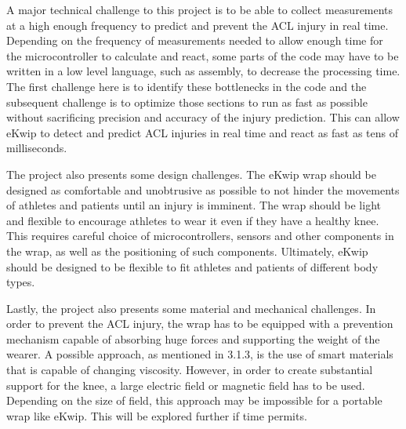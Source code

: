 A major technical challenge to this project is to be able to collect measurements at a high enough frequency to predict and prevent the ACL injury in real time. Depending on the frequency of measurements needed to allow enough time for the microcontroller to calculate and react, some parts of the code may have to be written in a low level language, such as assembly, to decrease the processing time. The first challenge here is to identify these bottlenecks in the code and the subsequent challenge is to optimize those sections to run as fast as possible without sacrificing precision and accuracy of the injury prediction. This can allow eKwip to detect and predict ACL injuries in real time and react as fast as tens of milliseconds.

The project also presents some design challenges. The eKwip wrap should be designed as comfortable and unobtrusive as possible to not hinder the movements of athletes and patients until an injury is imminent. The wrap should be light and flexible to encourage athletes to wear it even if they have a healthy knee. This requires careful choice of microcontrollers, sensors and other components in the wrap, as well as the positioning of such components. Ultimately, eKwip should be designed to be flexible to fit athletes and patients of different body types.

Lastly, the project also presents some material and mechanical challenges. In order to prevent the ACL injury, the wrap has to be equipped with a prevention mechanism capable of absorbing huge forces and supporting the weight of the wearer. A possible approach, as mentioned in 3.1.3, is the use of smart materials that is capable of changing viscosity. However, in order to create substantial support for the knee, a large electric field or magnetic field has to be used. Depending on the size of field, this approach may be impossible for a portable wrap like eKwip. This will be explored further if time permits. 